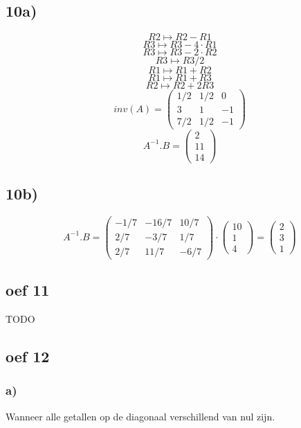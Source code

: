 \documentclass[10pt,a4paper]{article}
\begin{document}
\subsection*{10a)}
\[R2 \longmapsto R2 - R1 \]
\[R3 \longmapsto R3 -4\cdot R1 \]
\[R3 \longmapsto R3 -2\cdot R2 \]
\[R3 \longmapsto R3/2 \]
\[R1 \longmapsto R1 + R2 \]
\[R1 \longmapsto R1 + R3 \]
\[R2 \longmapsto R2 + 2R3 \]
\[inv(A) = 
\begin{pmatrix}
1/2 & 1/2 & 0\\
3 & 1 & -1\\
7/2 & 1/2 & -1
\end{pmatrix}
\]
\[A^{-1}.B = 
\begin{pmatrix}
2\\
11\\
14
\end{pmatrix}
\]
\subsection*{10b)}
\[A^{-1}.B = 
\begin{pmatrix}
-1/7 & -16/7 & 10/7\\
2/7 & -3/7 & 1/7\\
2/7 & 11/7 & -6/7
\end{pmatrix}
\cdot
\begin{pmatrix}
10\\
1\\
4
\end{pmatrix}
=
\begin{pmatrix}
2\\
3\\
1
\end{pmatrix}
\]

\subsection*{oef 11}
TODO

\subsection*{oef 12}
\subsubsection*{a)}
Wanneer alle getallen op de diagonaal verschillend van nul zijn.
\end{document}
